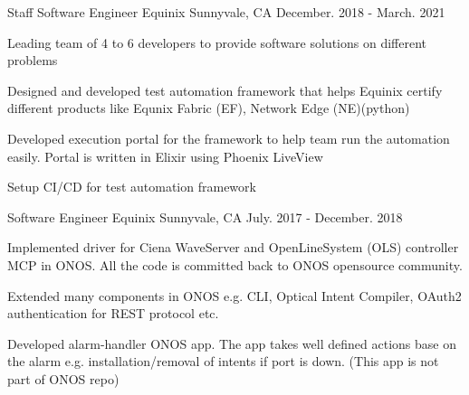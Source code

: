 \begin{cventries}
  \cventry
    {Staff Software Engineer} %
    {Equinix} %
    {Sunnyvale, CA} %
    {December. 2018 - March. 2021} %
    {
      \begin{cvitems} %
        \item {Leading team of 4 to 6 developers to provide software solutions on different problems}
        \item {Designed and developed test automation framework that helps Equinix certify different
               products like Equnix Fabric (EF), Network Edge (NE)(python)}
        \item {Developed execution portal for the framework to help team run the automation easily. Portal is written in Elixir using Phoenix LiveView}
        \item {Setup CI/CD for test automation framework}
      \end{cvitems}
    }

  \cventry
    {Software Engineer} %
    {Equinix} %
    {Sunnyvale, CA} %
    {July. 2017 - December. 2018} %
    {
      \begin{cvitems} %
        \item {Implemented driver for Ciena WaveServer and OpenLineSystem (OLS) controller MCP in ONOS.
               All the code is committed back to ONOS opensource community.}
        \item {Extended many components in ONOS e.g. CLI, Optical Intent Compiler, OAuth2
               authentication for REST protocol etc.}
        \item {Developed alarm-handler ONOS app. The app takes well defined
               actions base on the alarm e.g. installation/removal of intents if port is down.
               (This app is not part of ONOS repo)}
      \end{cvitems}
    }


\end{cventries}
